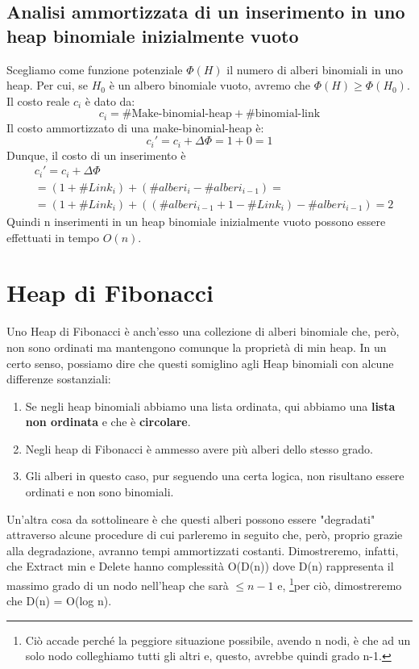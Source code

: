 \section{Analisi ammortizzata di un inserimento in uno heap binomiale inizialmente vuoto}
Scegliamo come funzione potenziale $\Phi(H)$ il numero di alberi binomiali in uno heap. Per cui, se $H_0$ è un albero binomiale vuoto, avremo che $\Phi(H)\geq \Phi(H_0)$. Il costo reale $c_i$ è dato da:
\[c_i=\#\text{Make-binomial-heap}+\#\text{binomial-link}\]
Il costo ammortizzato di una make-binomial-heap è:
\[c_i'=c_i+\Delta\Phi=1+0=1\]
Dunque, il costo di un inserimento è 
\begin{align*}
    &c_i'=c_i+\Delta\Phi\\
    &=(1+\#Link_i)+(\#alberi_i-\#alberi_{i-1})=\\
    &=(1+\#Link_i)+((\#alberi_{i-1}+1-\#Link_i)-\#alberi_{i-1}) = 2
\end{align*}
Quindi n inserimenti in un heap binomiale inizialmente vuoto possono essere effettuati in tempo $O(n)$.

\chapter{Heap di Fibonacci}
Uno Heap di Fibonacci è anch'esso una collezione di alberi binomiale che, però, non sono ordinati ma mantengono comunque la proprietà di min heap.
In un certo senso, possiamo dire che questi somiglino agli Heap binomiali con alcune differenze sostanziali:
\begin{enumerate}
    \item Se negli heap binomiali abbiamo una lista ordinata, qui abbiamo una \textbf{lista non ordinata} e che è \textbf{circolare}.
    \item Negli heap di Fibonacci è ammesso avere più alberi dello stesso grado. 
    \item Gli alberi in questo caso, pur seguendo una certa logica, non risultano essere ordinati e non sono binomiali.
\end{enumerate}
 Un'altra cosa da sottolineare è che questi alberi possono essere "degradati" attraverso alcune procedure di cui parleremo in seguito che, però, proprio grazie alla degradazione, avranno tempi ammortizzati costanti. Dimostreremo, infatti, che Extract min e Delete hanno complessità O(D(n)) dove D(n) rappresenta il massimo grado di un nodo nell’heap che sarà $\leq n-1$ e, \footnote{Ciò accade perché la peggiore situazione possibile, avendo n nodi, è che ad un solo nodo colleghiamo tutti gli altri e, questo, avrebbe quindi grado n-1.}per ciò, dimostreremo che D(n) = O(log n).  

